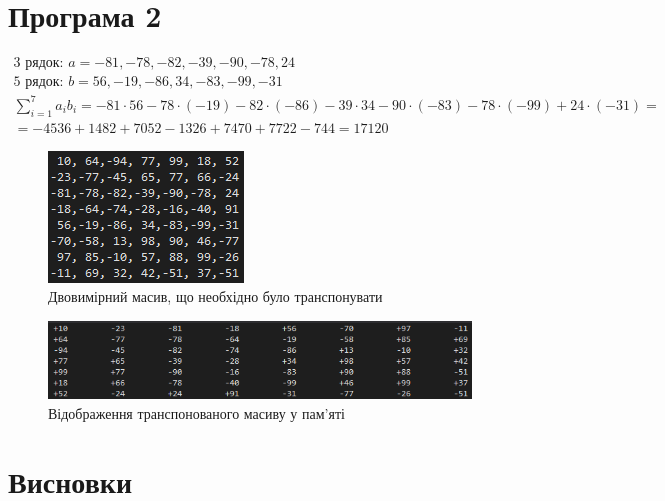 \documentclass{article}
\begin{document}
\begin{normalsize}
	\section*{Програма 2}
	\begin{gather}
		\text{3 рядок: }a= -81,-78,-82,-39,-90,-78, 24\nonumber\\
		\text{5 рядок: }b=56,-19,-86, 34,-83,-99,-31\nonumber\\
		\sum_{i=1}^{7}a_ib_i=-81\cdot56-78\cdot(-19)-82\cdot(-86)-39\cdot34-90\cdot(-83)-78\cdot(-99)+24\cdot(-31)=\nonumber\\=-4536+1482+7052-1326+7470+7722-744=17120\nonumber
	\end{gather}

	\begin{figure}[H]
		\centering
		\includegraphics[scale=1]{2}
		\caption{Двовимірний масив, що необхідно було транспонувати}
	\end{figure}

	\begin{figure}[H]
		\centering
		\includegraphics[scale=0.7]{3}
		\caption{Відображення транспонованого масиву у пам'яті}
	\end{figure}

	\section*{Висновки}
	
	    
\end{normalsize}
\end{document}
